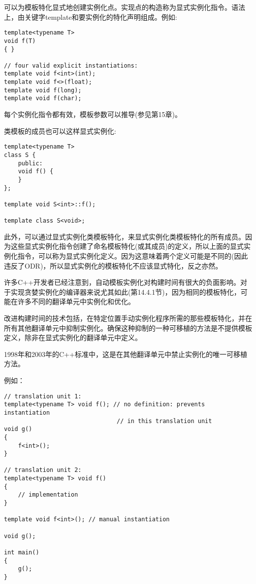 
可以为模板特化显式地创建实例化点。实现点的构造称为显式实例化指令。语法上，由关键字template和要实例化的特化声明组成。例如:

\begin{lstlisting}[style=styleCXX]
template<typename T>
void f(T)
{ }

// four valid explicit instantiations:
template void f<int>(int);
template void f<>(float);
template void f(long);
template void f(char);
\end{lstlisting}

每个实例化指令都有效，模板参数可以推导(参见第15章)。

类模板的成员也可以这样显式实例化:

\begin{lstlisting}[style=styleCXX]
template<typename T>
class S {
	public:
	void f() {
	}
};

template void S<int>::f();

template class S<void>;
\end{lstlisting}

此外，可以通过显式实例化类模板特化，来显式实例化类模板特化的所有成员。因为这些显式实例化指令创建了命名模板特化(或其成员)的定义，所以上面的显式实例化指令，可以称为显式实例化定义。因为这意味着两个定义可能是不同的(因此违反了ODR)，所以显式实例化的模板特化不应该显式特化，反之亦然。


许多C++开发者已经注意到，自动模板实例化对构建时间有很大的负面影响。对于实现贪婪实例化的编译器来说尤其如此(第14.4.1节)，因为相同的模板特化，可能在许多不同的翻译单元中实例化和优化。

改进构建时间的技术包括，在特定位置手动实例化程序所需的那些模板特化，并在所有其他翻译单元中抑制实例化。确保这种抑制的一种可移植的方法是不提供模板定义，除非在显式实例化的翻译单元中定义。

\begin{tcolorbox}[colback=webgreen!5!white,colframe=webgreen!75!black]
\hspace*{0.75cm}1998年和2003年的C++标准中，这是在其他翻译单元中禁止实例化的唯一可移植方法。
\end{tcolorbox}

例如：

\begin{lstlisting}[style=styleCXX]
// translation unit 1:
template<typename T> void f(); // no definition: prevents instantiation
								// in this translation unit
void g()
{
	f<int>();
}

// translation unit 2:
template<typename T> void f()
{
	// implementation
}

template void f<int>(); // manual instantiation

void g();

int main()
{
	g();
}
\end{lstlisting}

